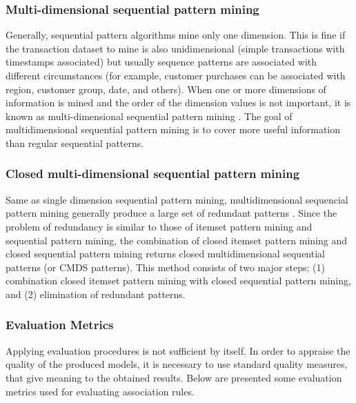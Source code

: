 \subsubsection*{Multi-dimensional sequential pattern mining}
Generally, sequential pattern algorithms mine only one dimension. This is fine if the transaction dataset to mine is also unidimensional (simple transactions with timestamps associated) but usually sequence patterns are associated with different circumstances (for example, customer purchases can be associated with region, customer group, date, and others). When one or more dimensions of information is mined and the order of the dimension values is not important, it is known as multi-dimensional sequential pattern mining \cite{pinto2001multi}. The goal of multidimensional sequential pattern mining is to cover more useful information than 
regular sequential patterns.

\subsubsection*{Closed multi-dimensional sequential pattern mining}
Same as single dimension sequential pattern mining, multidimensional sequencial pattern mining generally produce a large set of redundant patterns \cite{songram2008closed}. Since the problem of redundancy is similar to those of itemset pattern mining and sequential pattern mining, the combination of closed itemset pattern mining and closed sequential pattern mining returns closed multidimensional sequential patterns (or CMDS patterns). This method consists of two major steps; (1) combination closed itemset pattern mining with closed sequential pattern mining, and (2) elimination of redundant patterns.

\subsubsection{Evaluation Metrics}\label{sec:metrics}
Applying evaluation procedures is not sufficient by itself. In order to appraise the quality of the produced models, it is necessary to use standard quality measures, that give meaning to the obtained results. Below are presented some evaluation metrics used for evaluating association rules.

